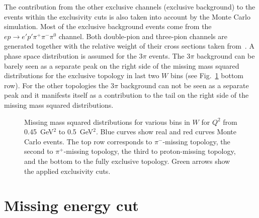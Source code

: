 The contribution from the other exclusive channels (exclusive background) to the events within the exclusivity cuts is also taken into account by the Monte Carlo simulation. Most of the exclusive background events come from the $e p \rightarrow e' p' \pi^{+} \pi^{-} \pi^{0}$ channel. Both double-pion and three-pion channels are generated together with the relative weight of their cross sections taken from~\cite{Wu:2005wf}.  A phase space distribution is assumed for the $3\pi$ events. The $3\pi$ background can be barely seen as a separate peak on the right side of the missing mass squared distributions for the exclusive topology in last two $W$ bins (see Fig.~\ref{fig:excl_miss_mass} bottom row). For the other topologies the $3\pi$ background can not be seen as a separate peak and it manifests itself as a contribution to the tail on the right side of the missing mass squared distributions.

\begin{figure}[htp]
\begin{center}
\caption{\small Missing mass squared distributions for various bins in $W$ for $Q^2$ from 0.45~GeV$^2$ to 0.5~GeV$^2$. Blue curves show real and red curves Monte Carlo events. The top row corresponds to $\pi^-$-missing topology, the second to $\pi^+$-missing topology, the third to proton-missing topology, and the bottom to the fully exclusive topology. Green arrows show the applied exclusivity cuts.  \label{fig:excl_miss_mass}}
\end{center}
\end{figure}

\section{Missing energy cut}
\label{miss_energ}

